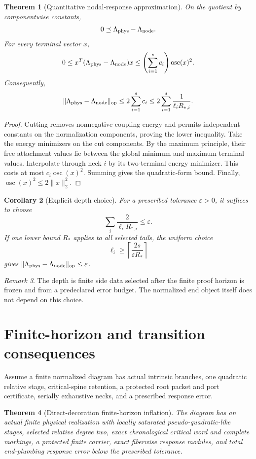 \documentclass[11pt]{article}
\newtheorem{theorem}{Theorem}[section]
\newtheorem{corollary}[theorem]{Corollary}
\theoremstyle{definition}
\theoremstyle{remark}
\newtheorem{remark}[theorem]{Remark}
\newcommand{\osc}{\operatorname{osc}}
\newcommand{\op}{\mathrm{op}}
\newcommand{\preceqL}{\preceq}
\begin{document}
\begin{theorem}[Quantitative nodal-response approximation]
On the quotient by componentwise constants,
\[
 0\preceqL\Lambda_{\rm phys}-\Lambda_{\rm node}.
\]
For every terminal vector $x$,
\[
 0\le x^T(\Lambda_{\rm phys}-\Lambda_{\rm node})x
 \le\left(\sum_{i=1}^sc_i\right)\osc(x)^2.
\]
Consequently,
\[
 \|\Lambda_{\rm phys}-\Lambda_{\rm node}\|_{\op}
 \le2\sum_{i=1}^sc_i
 \le2\sum_{i=1}^s\frac1{\ell_iR_{*,i}}.
\]
\end{theorem}

\begin{proof}
Cutting removes nonnegative coupling energy and permits independent constants
on the normalization components, proving the lower inequality.  Take the
energy minimizers on the cut components.  By the maximum principle, their free
attachment values lie between the global minimum and maximum terminal values.
Interpolate through neck $i$ by its two-terminal energy minimizer.  This costs
at most $c_i\osc(x)^2$.  Summing gives the quadratic-form bound.  Finally,
$\osc(x)^2\le2\|x\|_2^2$.
\end{proof}

\begin{corollary}[Explicit depth choice]
For a prescribed tolerance $\varepsilon>0$, it suffices to choose
\[
 \sum_i\frac{2}{\ell_iR_{*,i}}\le\varepsilon.
\]
If one lower bound $R_*$ applies to all selected tails, the uniform choice
\[
 \ell_i\ge\left\lceil\frac{2s}{\varepsilon R_*}\right\rceil
\]
gives
$\|\Lambda_{\rm phys}-\Lambda_{\rm node}\|_{\op}\le\varepsilon$.
\end{corollary}

\begin{remark}
The depth is finite side data selected after the finite proof horizon is
frozen and from a predeclared error budget.  The normalized end object itself
does not depend on this choice.
\end{remark}

\section{Finite-horizon and transition consequences}
Assume a finite normalized diagram has actual intrinsic branches, one
quadratic relative stage, critical-spine retention, a protected root packet and
port certificate, serially exhaustive necks, and a prescribed response error.

\begin{theorem}[Direct-decoration finite-horizon inflation]
The diagram has an actual finite physical realization with locally saturated
pseudo-quadratic-like stages, selected relative degree two, exact chronological
critical word and complete markings, a protected finite carrier, exact
fiberwise response modules, and total end-plumbing response error below the
prescribed tolerance.
\end{theorem}
\end{document}
